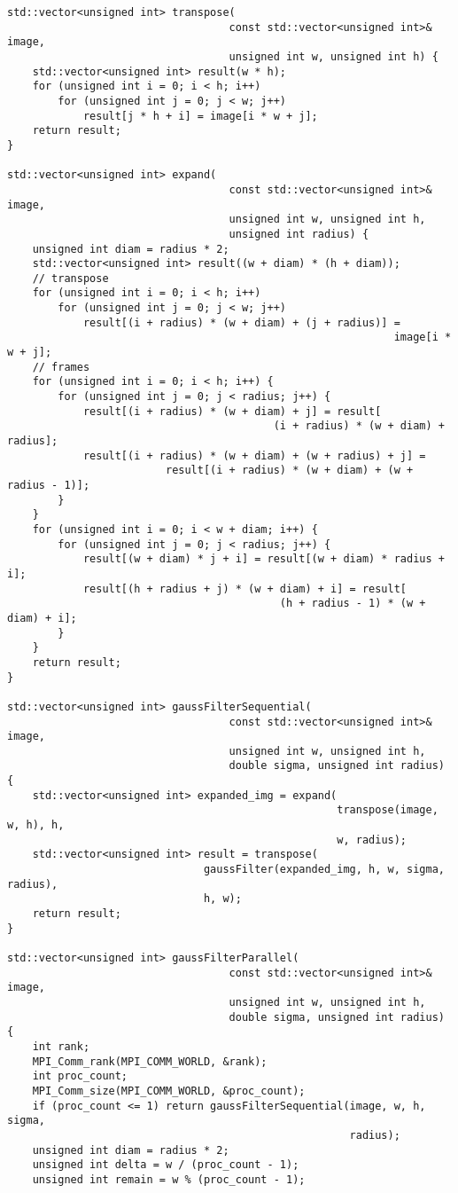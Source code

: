 \documentclass{report}
\begin{document}
\begin{lstlisting}
std::vector<unsigned int> transpose(
                                   const std::vector<unsigned int>& image,
                                   unsigned int w, unsigned int h) {
    std::vector<unsigned int> result(w * h);
    for (unsigned int i = 0; i < h; i++)
        for (unsigned int j = 0; j < w; j++)
            result[j * h + i] = image[i * w + j];
    return result;
}

std::vector<unsigned int> expand(
                                   const std::vector<unsigned int>& image,
                                   unsigned int w, unsigned int h,
                                   unsigned int radius) {
    unsigned int diam = radius * 2;
    std::vector<unsigned int> result((w + diam) * (h + diam));
    // transpose
    for (unsigned int i = 0; i < h; i++)
        for (unsigned int j = 0; j < w; j++)
            result[(i + radius) * (w + diam) + (j + radius)] =
                                                             image[i * w + j];
    // frames
    for (unsigned int i = 0; i < h; i++) {
        for (unsigned int j = 0; j < radius; j++) {
            result[(i + radius) * (w + diam) + j] = result[
                                          (i + radius) * (w + diam) + radius];
            result[(i + radius) * (w + diam) + (w + radius) + j] =
                         result[(i + radius) * (w + diam) + (w + radius - 1)];
        }
    }
    for (unsigned int i = 0; i < w + diam; i++) {
        for (unsigned int j = 0; j < radius; j++) {
            result[(w + diam) * j + i] = result[(w + diam) * radius + i];
            result[(h + radius + j) * (w + diam) + i] = result[
                                           (h + radius - 1) * (w + diam) + i];
        }
    }
    return result;
}

std::vector<unsigned int> gaussFilterSequential(
                                   const std::vector<unsigned int>& image,
                                   unsigned int w, unsigned int h,
                                   double sigma, unsigned int radius) {
    std::vector<unsigned int> expanded_img = expand(
                                                    transpose(image, w, h), h,
                                                    w, radius);
    std::vector<unsigned int> result = transpose(
                               gaussFilter(expanded_img, h, w, sigma, radius),
                               h, w);
    return result;
}

std::vector<unsigned int> gaussFilterParallel(
                                   const std::vector<unsigned int>& image,
                                   unsigned int w, unsigned int h,
                                   double sigma, unsigned int radius) {
    int rank;
    MPI_Comm_rank(MPI_COMM_WORLD, &rank);
    int proc_count;
    MPI_Comm_size(MPI_COMM_WORLD, &proc_count);
    if (proc_count <= 1) return gaussFilterSequential(image, w, h, sigma,
                                                      radius);
    unsigned int diam = radius * 2;
    unsigned int delta = w / (proc_count - 1);
    unsigned int remain = w % (proc_count - 1);


\end{lstlisting}
\end{document}
